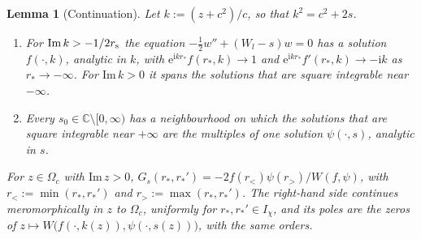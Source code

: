 \documentclass[%
 aip,
 jmp,
 amsmath,amssymb,
 reprint, onecolumn
]{revtex4-1}
\newtheorem{alemma}{Lemma}
\theoremstyle{definition}
\theoremstyle{remark}
\newcommand{\C}{\mathbb{C}}
\newcommand{\rmi}{\mathrm{i}}
\newcommand{\rme}{\mathrm{e}}
\begin{document}
\begin{alemma}[Continuation]\label{lem:continuation}
Let $k:=(z+c^2)/c$, so that $k^2=c^2+2s$.
\begin{enumerate}[label=(\roman*)]
\item For $\mathrm{Im}\,k>-1/2r_{\rm s}$ the equation
$-\frac12w''+(W_l-s)w=0$ has a solution $f(\cdot,k)$, analytic in $k$,
with $\rme^{\rmi kr_*}f(r_*,k)\to1$ and $\rme^{\rmi kr_*}f'(r_*,k)\to
-\rmi k$ as $r_*\to-\infty$. For $\mathrm{Im}\,k>0$ it spans the
solutions that are square integrable near $-\infty$.
\item Every $s_0\in\C\setminus[0,\infty)$ has a neighbourhood on which the
solutions that are square integrable near $+\infty$ are the multiples of
one solution $\psi(\cdot,s)$, analytic in $s$.
\end{enumerate}
For $z\in\Omega_c$ with $\mathrm{Im}\,z>0$,
$G_s(r_*,r_*')=-2f(r_<)\psi(r_>)/W(f,\psi)$, with
$r_<:=\min(r_*,r_*')$ and $r_>:=\max(r_*,r_*')$. The right-hand side
continues meromorphically in $z$ to $\Omega_c$, uniformly for
$r_*,r_*'\in I_\chi$, and its poles are the zeros of
$z\mapsto W\bigl(f(\cdot,k(z)),\psi(\cdot,s(z))\bigr)$, with the same
orders.
\end{alemma}
\end{document}
